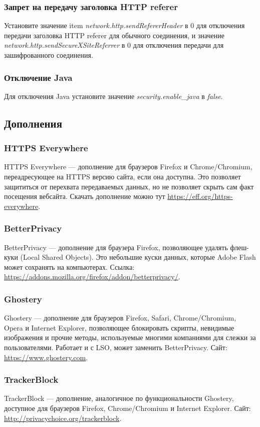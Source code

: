 \subsubsection{Запрет на передачу заголовка HTTP referer}
Установите значение item \textit{network.http.sendRefererHeader} в  0 для отключения передачи заголовка HTTP referer для обычного соединения, и значение  \textit{network.http.sendSecureXSiteReferrer} в 0 для отключения передачи для зашифрованного соединения.
\subsubsection{Отключение Java}
Для отключения Java установите значение \textit{security.enable\_java} в \textit{false}.
\subsection{Дополнения}
\subsubsection{HTTPS Everywhere}
HTTPS Everywhere --- дополнение для браузеров Firefox и Chrome/Chromium, переадресующее на HTTPS версию сайта, если она доступна. Это позволяет защититься от перехвата передаваемых данных, но не позволяет скрыть сам факт посещения вебсайта. Скачать дополнение можно тут \url{https://eff.org/https-everywhere}.
\subsubsection{BetterPrivacy}
BetterPrivacy --- дополнение для браузера Firefox, позволяющее удалять флеш-куки (Local Shared Objects). Это небольшие куски данных, которые Adobe Flash может сохранять на компьютерах. Ссылка: \url{https://addons.mozilla.org/firefox/addon/betterprivacy/}.
\subsubsection{Ghostery}
Ghostery --- дополнение для браузеров Firefox, Safari, Chrome/Chromium, Opera и Internet Explorer, позволяющее блокировать скрипты, невидимые изображения и прочие методы, используемые многими компаниями для слежки за пользователями. Работает и с LSO, может заменить BetterPrivacy. Сайт: \url{https://www.ghostery.com}.
\subsubsection{TrackerBlock}
TrackerBlock --- дополнение, аналогичное по функциональности Ghostery, доступное для браузеров Firefox, Chrome/Chromium и Internet Explorer. Сайт: \url{http://privacychoice.org/trackerblock}.
